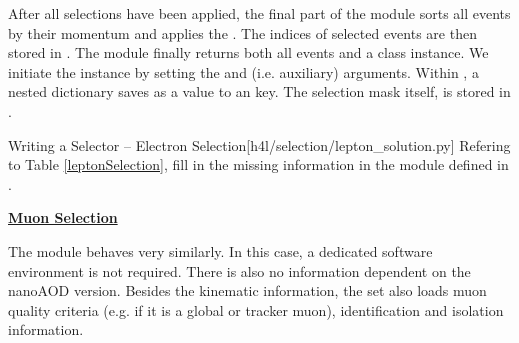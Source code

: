 After all selections have been applied, the final part of the module sorts all events by their momentum and applies the .
The indices of selected events are then stored in .
The  module finally returns both all events and a  class instance.
We initiate the  instance by setting the  and  (i.e. auxiliary) arguments.
Within , a nested dictionary saves  as a value to an  key.
The selection mask itself,  is stored in .

\begin{exercise}{Writing a Selector -- Electron Selection}[h4l/selection/lepton\_solution.py]
	Refering to Table \ref{leptonSelection}, fill in the missing information in the  module  defined in .
\end{exercise}

\vspace{0.8cm}

\textbf{\underline{Muon Selection}}

The  module behaves very similarly. In this case, a dedicated software environment is not required.
There is also no information dependent on the nanoAOD version.
Besides the kinematic information, the  set also loads muon quality criteria (e.g. if it is a global or tracker muon), identification and isolation information.

